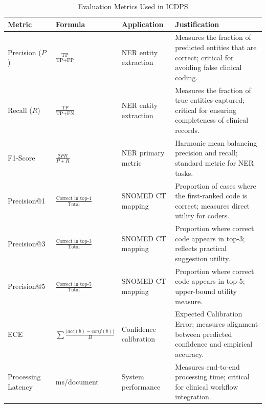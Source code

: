 \begin{table}[htbp]
\centering
\caption{Evaluation Metrics Used in ICDPS}
\label{tab:eval_metrics}

\begin{tabular}{
|>{\centering\arraybackslash}m{2.4cm}
|>{\centering\arraybackslash}m{3.2cm}
|>{\centering\arraybackslash}m{2.8cm}
|>{\raggedright\arraybackslash}m{5.2cm}|}
\hline

\textbf{Metric} &
\textbf{Formula} &
\textbf{Application} &
\textbf{Justification}
\\
\hline

Precision ($P$)
&
$\displaystyle \frac{\text{TP}}{\text{TP}+\text{FP}}$
&
NER entity extraction
&
Measures the fraction of predicted entities that are correct; critical for avoiding false clinical coding.
\\
\hline

Recall ($R$)
&
$\displaystyle \frac{\text{TP}}{\text{TP}+\text{FN}}$
&
NER entity extraction
&
Measures the fraction of true entities captured; critical for ensuring completeness of clinical records.
\\
\hline

F1-Score
&
$\displaystyle \frac{2PR}{P+R}$
&
NER primary metric
&
Harmonic mean balancing precision and recall; standard metric for NER tasks.
\\
\hline

Precision@1
&
$\displaystyle \frac{\text{Correct in top-1}}{\text{Total}}$
&
SNOMED CT mapping
&
Proportion of cases where the first-ranked code is correct; measures direct utility for coders.
\\
\hline

Precision@3
&
$\displaystyle \frac{\text{Correct in top-3}}{\text{Total}}$
&
SNOMED CT mapping
&
Proportion where correct code appears in top-3; reflects practical suggestion utility.
\\
\hline

Precision@5
&
$\displaystyle \frac{\text{Correct in top-5}}{\text{Total}}$
&
SNOMED CT mapping
&
Proportion where correct code appears in top-5; upper-bound utility measure.
\\
\hline

ECE
&
$\sum \frac{|acc(b)-conf(b)|}{B}$
&
Confidence calibration
&
Expected Calibration Error; measures alignment between predicted confidence and empirical accuracy.
\\
\hline

Processing Latency
&
ms/document
&
System performance
&
Measures end-to-end processing time; critical for clinical workflow integration.
\\
\hline

\end{tabular}
\end{table}

